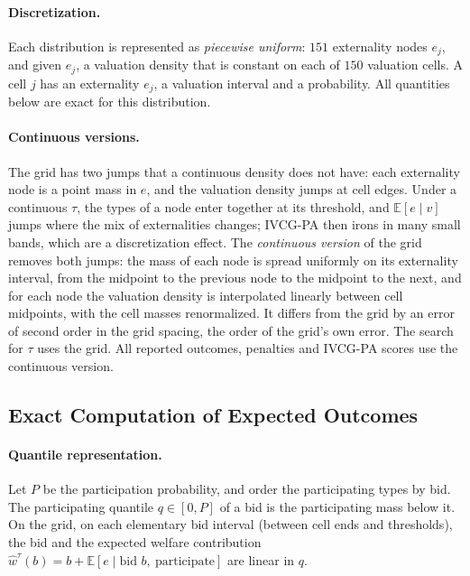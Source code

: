 \documentclass[11pt]{article}
\begin{document}
\paragraph{Discretization.} Each distribution is represented as \emph{piecewise uniform}: $151$ externality nodes $e_j$, and given $e_j$, a valuation density that is constant on each of $150$ valuation cells. A cell $j$ has an externality $e_j$, a valuation interval and a probability. All quantities below are exact for this distribution.

\paragraph{Continuous versions.} The grid has two jumps that a continuous density does not have: each externality node is a point mass in $e$, and the valuation density jumps at cell edges. Under a continuous $\tau$, the types of a node enter together at its threshold, and $\mathbb{E}[e\mid v]$ jumps where the mix of externalities changes; IVCG-PA then irons in many small bands, which are a discretization effect. The \emph{continuous version} of the grid removes both jumps: the mass of each node is spread uniformly on its externality interval, from the midpoint to the previous node to the midpoint to the next, and for each node the valuation density is interpolated linearly between cell midpoints, with the cell masses renormalized. It differs from the grid by an error of second order in the grid spacing, the order of the grid's own error. The search for $\tau$ uses the grid. All reported outcomes, penalties and IVCG-PA scores use the continuous version.

\subsection{Exact Computation of Expected Outcomes}\label{sec:exact}

\paragraph{Quantile representation.} Let $P$ be the participation probability, and order the participating types by bid. The participating quantile $q\in[0,P]$ of a bid is the participating mass below it. On the grid, on each elementary bid interval (between cell ends and thresholds), the bid and the expected welfare contribution $\hat w^\tau(b)=b+\mathbb{E}[e\mid\text{bid }b,\ \text{participate}]$ are linear in $q$.
\end{document}
